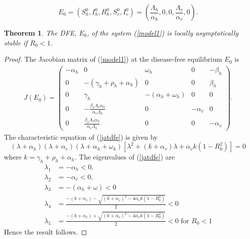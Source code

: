 \documentclass[review]{elsarticle}
\newtheorem{theorem}{Theorem}
\begin{document}
\[
E_0=(S_h^0,I_h^0,R_h^0,S_v^0,I_v^0)=\left(\frac{\Lambda_h}{\alpha_h},0,0,\frac{\Lambda_v}{\alpha_v},0\right).
\]

\begin{theorem}
The DFE, $E_0$, of the system (\ref{model1}) is \textit{locally asymptotically stable} if $R_0<1$.
\end{theorem}

\begin{proof}
The Jacobian matrix of (\ref{model1}) at the disease-free equilibrium $E_0$ is
\begin{align}\label{jatdfe}
J(E_0)=
\begin{pmatrix}
-\alpha_h &  0                                                            & \omega_h             & 0         & -\beta_h  \\
0         & -(\gamma_h+\rho_h+\alpha_h)                                   & 0                    & 0         & \beta_h  \\
0         & \gamma_h                                                      & -(\alpha_h+\omega_h) & 0         &  0   \\
0         & -\frac{\beta_{v}\Lambda_{v}\alpha_{h}}{\alpha_{v}\Lambda_{h}} & 0                    & -\alpha_v & 0\\
0         & \frac{\beta_{v}\Lambda_{v}\alpha_{h}}{\alpha_{v}\Lambda_{h}}  & 0                    &  0        & -\alpha_v
\end{pmatrix}.
\end{align}
The characteristic equation of (\ref{jatdfe}) is given by
\[
(\lambda+\alpha_h)(\lambda+\alpha_v)(\lambda+\alpha_h+\omega_h)[\lambda^2+(k+\alpha_v)\lambda+\alpha_vk(1-R_0^2)]=0
\]
where $k=\gamma_h+\rho_h+\alpha_h$. The eigenvalues of (\ref{jatdfe}) are
\begin{align*}
\lambda_1&=-\alpha_h<0,\\ \lambda_2&=-\alpha_v<0,\\ \lambda_3&=-(\alpha_h+\omega)<0\\
\lambda_4&=\frac{-(k+\alpha_v)-\sqrt{(k+\alpha_v)^2-4\alpha_vk(1-R_0^2)}}{2}<0\\
\lambda_5&=\frac{-(k+\alpha_v)+\sqrt{(k+\alpha_v)^2-4\alpha_vk(1-R_0^2)}}{2}<0\mbox{ for }R_0<1
\end{align*}
Hence the result follows.
\end{proof}
\end{document}
